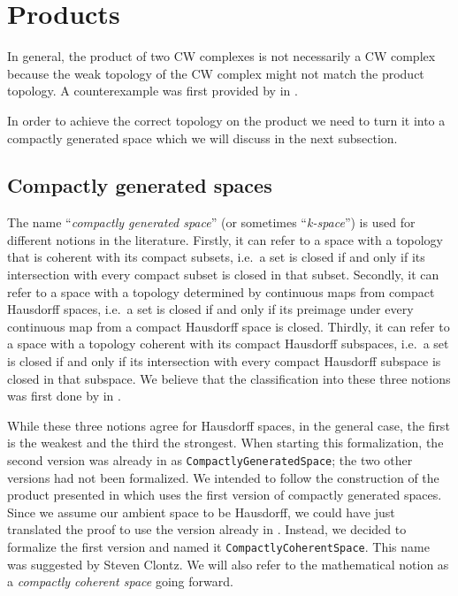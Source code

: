 \section{Products}\label{sec:products}

In general, the product of two CW complexes is not necessarily a CW complex because the weak topology of the CW complex might not match the product topology.
A counterexample was first provided by \citeauthor{Dowker1952} in \cite{Dowker1952}.

In order to achieve the correct topology on the product we need to turn it into a compactly generated space which we will discuss in the next subsection.

\subsection{Compactly generated spaces}

The name ``\emph{compactly generated space}'' (or sometimes ``\emph{k-space}'') is used for different notions in the literature.
Firstly, it can refer to a space with a topology that is coherent with its compact subsets, i.e.\ a set is closed if and only if its intersection with every compact subset is closed in that subset. 
Secondly, it can refer to a space with a topology determined by continuous maps from compact Hausdorff spaces, i.e.\ a set is closed if and only if its preimage under every continuous map from a compact Hausdorff space is closed. 
Thirdly, it can refer to a space with a topology coherent with its compact Hausdorff subspaces, i.e.\ a set is closed if and only if its intersection with every compact Hausdorff subspace is closed in that subspace. 
We believe that the classification into these three notions was first done by \citeauthor{Wikipedia2025} in \cite{Wikipedia2025}.

While these three notions agree for Hausdorff spaces, in the general case, the first is the weakest and the third the strongest. 
When starting this formalization, the second version was already in \mathlib as \lstinline|CompactlyGeneratedSpace|; the two other versions had not been formalized. 
We intended to follow the construction of the product presented in \cite{Hatcher2002} which uses the first version of compactly generated spaces. 
Since we assume our ambient space to be Hausdorff, we could have just translated the proof to use the version already in \mathlib. 
Instead, we decided to formalize the first version and named it \lstinline|CompactlyCoherentSpace|.
This name was suggested by Steven Clontz. 
We will also refer to the mathematical notion as a \emph{compactly coherent space} going forward.

